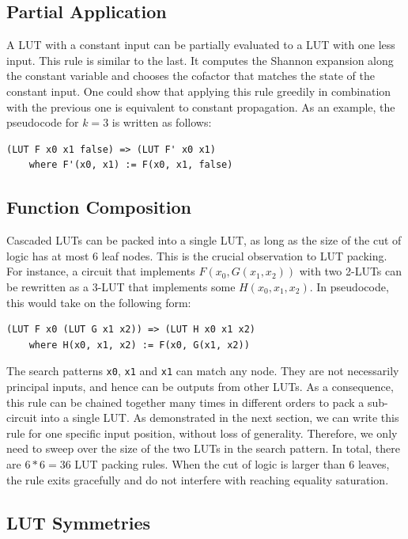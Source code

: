 \subsection{Partial Application}\label{sec:rewrites:application}
A LUT with a constant input can be partially evaluated to a LUT with one less
input. This rule is similar to the last. It computes the Shannon expansion
along the constant variable and chooses the cofactor that matches the state of
the constant input. One could show that applying this rule greedily in
combination with the previous one is equivalent to constant propagation. As an
example, the pseudocode for $k=3$ is written as follows:

\begin{lstlisting}
(LUT F x0 x1 false) => (LUT F' x0 x1)
    where F'(x0, x1) := F(x0, x1, false)
\end{lstlisting}

\subsection{Function Composition}\label{sec:rewrites:composition}

Cascaded LUTs can be packed into a single LUT, as long as the size of the cut
of logic has at most 6 leaf nodes. This is the crucial observation to LUT
packing. For instance, a circuit that implements $F(x_0, G(x_1, x_2))$ with two
2-LUTs can be rewritten as a 3-LUT that implements some $H(x_0, x_1, x_2)$. In
pseudocode, this would take on the following form:

\begin{lstlisting}
(LUT F x0 (LUT G x1 x2)) => (LUT H x0 x1 x2)
    where H(x0, x1, x2) := F(x0, G(x1, x2))
\end{lstlisting}

The search patterns \texttt{x0}, \texttt{x1} and \texttt{x1} can match any
node. They are not necessarily principal inputs, and hence can be outputs from
other LUTs. As a consequence, this rule can be chained together many times in
different orders to pack a sub-circuit into a single LUT. As demonstrated in
the next section, we can write this rule for one specific input position,
without loss of generality. Therefore, we only need to sweep over the size of
the two LUTs in the search pattern. In total, there are $6*6 = 36$ LUT packing
rules. When the cut of logic is larger than 6 leaves, the rule exits gracefully
and do not interfere with reaching equality saturation.
\subsection{LUT Symmetries}\label{sec:rewrites:symmetry}

